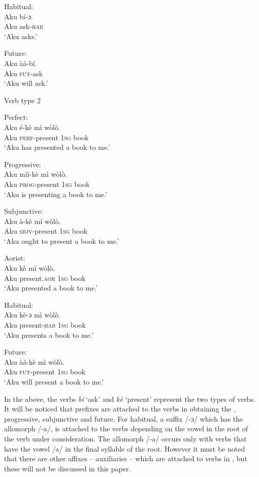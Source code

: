 \documentclass[output=paper,newtxmath,modfonts,nonflat,draftmode]{langsci/langscibook}
\begin{document}
\ex Habitual:\\
\gll Aku bí-ɔ.\\
Aku ask-\textsc{hab}\\
\glt `Aku asks.'

\ex Future:\\
\gll Aku àá-bí.\\
Aku \textsc{fut}-ask\\
\glt `Aku will ask.'
\z
\z
 

\newpage 
Verb type 2



\ea \label{ex:ollennu:46} 
\ea
Perfect:\\
\gll Aku é-kè mì wòlò.\\
Aku \textsc{perf}-present 1\textsc{sg} book\\
\glt 	`Aku has presented a book to me.'

\ex Progressive:\\
\gll Aku mìì-kè mì wòlò.\\
Aku \textsc{prog}-present 1\textsc{sg} book\\
\glt `Aku is presenting a book to me.'

\ex Subjunctive:\\
\gll Aku à-kè mí wòlò.\\
Aku \textsc{sbjv}-present 1\textsc{sg} book\\
\glt `Aku ought to present a book to me.'
\z
\z


\ea Aorist:\\
\ea
\gll Aku kè mì wòlò.\\
Aku present.\textsc{aor} 1\textsc{sg} book\\
\glt `Aku presented a book to me.'

\ex Habitual:\\
\gll Aku kè-ɔ mì wòlò.\\
Aku present-\textsc{hab} 1\textsc{sg} book\\
\glt `Aku presents a book to me.'

\ex Future:\\
\gll Aku àá-kè mì wòlò.\\
Aku \textsc{fut}-present 1\textsc{sg} book\\
\glt `Aku will present a book to me.'
\z
\z 

In the above, the verbs  \textit{bí} `ask' and \textit{kè} `present' represent the two types of verbs. It will be noticed that prefixes are attached to the verbs in obtaining the , progressive, subjunctive and future. For habitual, a suffix /-ɔ/ which has the allomorph /-a/, is attached to the verbs depending on the vowel in the root of the verb under consideration. The allomorph /-a/ occurs only with verbs that have the vowel /a/ in the final syllable of the root. However it must be noted that there are other affixes -- auxiliaries -- which are attached to verbs in , but these will not be discussed in this paper.
\end{document}
